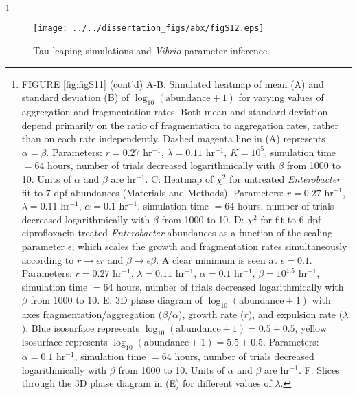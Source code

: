 {{{{{{{\let\thefootnote\relax\footnote{FIGURE \ref{fig:figS11} (cont'd) A-B: Simulated heatmap of mean (A) and standard deviation (B) of $\log_{10}(\text{abundance} + 1)$ for varying values of aggregation and fragmentation rates. Both mean and standard deviation depend primarily on the ratio of fragmentation to aggregation rates, rather than on each rate independently. Dashed magenta line in (A) represents $\alpha = \beta$. Parameters: $r = 0.27$ hr$^{-1}$, $\lambda = 0.11$ hr$^{-1}$, $K = 10^5$, simulation time $= 64$ hours, number of trials decreased logarithmically with $\beta$ from 1000 to 10. Units of $\alpha$ and $\beta$ are hr$^{-1}$.  C: Heatmap of $\chi^2$ for untreated \textit{Enterobacter} fit to 7 dpf abundances (Materials and Methods). Parameters: $r = 0.27$ hr$^{-1}$, $\lambda = 0.11$ hr$^{-1}$, $\alpha = 0.1$ hr$^{-1}$, simulation time $= 64$ hours, number of trials decreased logarithmically with $\beta$ from 1000 to 10. D:   $\chi^2$ for fit to 6 dpf ciprofloxacin-treated \textit{Enterobacter} abundances as a function of the scaling parameter $\epsilon$, which scales the growth and fragmentation rates simultaneously according to $r \to \epsilon r$ and $\beta \to \epsilon \beta$. A clear minimum is seen at $\epsilon = 0.1$. Parameters: $r = 0.27$ hr$^{-1}$, $\lambda = 0.11$ hr$^{-1}$, $\alpha = 0.1$ hr$^{-1}$, $\beta = 10^{1.5}$ hr$^{-1}$, simulation time $= 64$ hours, number of trials decreased logarithmically with $\beta$ from 1000 to 10. E: 3D phase diagram of $\log_{10}(\text{abundance} + 1)$ with axes fragmentation/aggregation ($\beta/\alpha$), growth rate ($r$), and expulsion rate ($\lambda$). Blue isosurface represents $\log_{10}(\text{abundance} + 1) = 0.5 \pm 0.5$, yellow isosurface represents  $\log_{10}(\text{abundance} + 1) = 5.5 \pm 0.5$. Parameters: $\alpha = 0.1$ hr$^{-1}$, simulation time $= 64$ hours, number of trials decreased logarithmically with $\beta$ from 1000 to 10. Units of $\alpha$ and $\beta$ are hr$^{-1}$. F: Slices through the 3D phase diagram in (E) for different values of $\lambda$.}


\begin{figure}[H]
	\centerline{
		\texttt{[image: ../../dissertation\_figs/abx/figS12.eps]}} 
	\caption{Tau leaping simulations and \textit{Vibrio} parameter inference.}
	\label{fig:figS12}
\end{figure}

}}}}}}}
